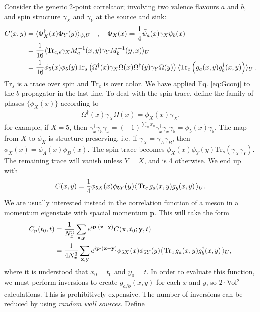 Consider the generic 2-point correlator; involving two valence flavours $a$ and $b$, and spin structure $\gamma_X$ and $\gamma_Y$ at the source and sink:
\begin{align}
  C(x,y) &= \langle \Phi^{\dagger}_X(x) \Phi_Y(y) \rangle_{\psi,U} \quad , \quad \Phi_X(x) = {1\over 4}\bar{\psi}_a(x) \gamma_X \psi_b(x) \\
  \nonumber
  &= {1\over 16}\langle \text{Tr}_{c,s} \gamma_X M^{-1}_{a}(x,y) \gamma_Y M^{-1}_{b}(y,x) \rangle_U \\
  &= {1\over 16}\phi_5(x)\phi_5(y)\text{Tr}_s \left( \Omega^{\dagger}(x) \gamma_X \Omega(x) \Omega^{\dagger}(y) \gamma_Y \Omega(y) \right)
  \langle \text{Tr}_c \left( g_{a}(x,y) g^{\dagger}_{b}(x,y) \right) \rangle_U\,. \nonumber
\end{align}
$\text{Tr}_s$ is a trace over spin and $\text{Tr}_c$ is over color. We have applied Eq. \eqref{eq:Gconj} to the $b$ propagator in the last line. To deal with the spin trace, define the family of phases $\{\phi_X(x)\}$ according to
\begin{align}
  \Omega^{\dagger}(x)\gamma_X\Omega(x) = \phi_X(x) \gamma_X.
\end{align}
for example, if $X=5$, then $\gamma^{\dagger}_x\gamma_5\gamma_x = (-1)^{\sum_{\mu}x_{\mu}} \gamma^{\dagger}_x\gamma_x \gamma_5 = \phi_5(x) \gamma_5$. The map from $X$ to $\phi_X$ is structure preserving, i.e. if $\gamma_X=\gamma_A\gamma_B$, then $\phi_X(x)=\phi_A(x)\phi_B(x)$. The spin trace becomes $\phi_X(x)\phi_Y(y) \text{Tr}_s\left( \gamma_X \gamma_Y \right)$. The remaining trace will vanish unless $Y=X$, and is 4 otherwise. We end up with
\begin{align}
  C(x,y) = {1\over 4} \phi_{5X}(x)\phi_{5Y}(y) \langle \,\text{Tr}_c \,g_a(x,y) g^{\dagger}_b(x,y) \,\rangle_U.
\end{align}
We are usually interested instead in the correlation function of a meson in a momentum eigenstate with spacial momentum ${\textbf{p}}$. This will take the form
\begin{align}
  \nonumber
  C_{\textbf{p}}(t_0,t) &= {1\over N_x^3} \sum_{{\textbf{x}},{\textbf{y}}} e^{i{\textbf{p}}\cdot({\textbf{x}}-{\textbf{y}})}
  C({\textbf{x}},t_0;{\textbf{y}},t) \\
  &= {1\over 4 N_x^3} \sum_{{\textbf{x}},{\textbf{y}}} e^{i{\textbf{p}}\cdot({\textbf{x}}-{\textbf{y}})} \phi_{5X}(x)\phi_{5Y}(y) \langle \,\text{Tr}_c \,g_a(x,y)g^{\dagger}_b(x,y)\,\rangle_U,
\end{align}
where it is understood that $x_0=t_0$ and $y_0=t$. In order to evaluate this function, we must perform inversions to create $g_{a/b}(x,y)$ for each $x$ and $y$, so $2\cdot$Vol$^2$ calculations. This is prohibitively expensive. The number of inversions can be reduced by using {\it{random wall sources}}. Define
